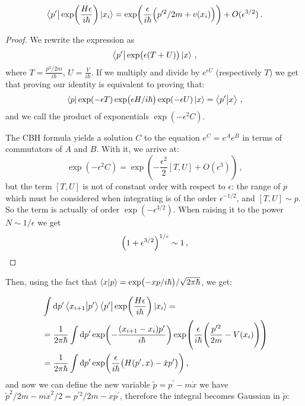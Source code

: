 \documentclass[main.tex]{subfiles}
\begin{document}
\begin{claim}
\begin{equation}
  \bra{p'} 
  \exp(\frac{H \epsilon }{i \hbar}) \ket{x_i}
  = \exp(\frac{\epsilon }{i \hbar} \qty(p^{\prime 2}/2m + v(x_{i}))) + O(\epsilon^{3/2})
\,.
\end{equation}
\end{claim}

\begin{proof}
  We rewrite the expression as 
  \begin{equation}
    \bra{p^{\prime }} \exp(\epsilon (T+U)) \ket{x}  
  \,,
  \end{equation}
  where \(T = \frac{p^2/2m}{ i \hbar} \), \(U = \frac{V}{i \hbar}\).
  If we multiply and divide by \(e^{\epsilon U}\) (respectively \(T\)) we get that proving our identity is equivalent to proving that: 
  \begin{equation}
    \bra{p} \exp(-\epsilon T) \exp(\epsilon H / i \hbar) \exp(-\epsilon U) \ket{x}  = \braket{p'}{x} 
  \,,
  \end{equation}
  and we call the product of exponentials \(\exp(-\epsilon^2 C) \).

  The CBH formula yields a solution \(C\) to the equation \(e^{C}= e^{A}e^{B}\) in terms of commutators of \(A\) and \(B\).
  With it, we arrive at:  
  \begin{equation}
    \exp(-\epsilon^2 C) = \exp(- \frac{\epsilon^2}{2} [T, U] + O(\epsilon^3)) 
  \,,
  \end{equation}
  but the term \([T, U]\) is not of constant order with respect to \(\epsilon \): the range of \(p\) which must be considered when integrating is of the order \(\epsilon^{-1/2}\), and \([T, U] \sim p\). So the term is actually of order \(\exp(-\epsilon^{3/2}) \). When raising it to the power \(N \sim 1/ \epsilon \) we get 
  \begin{equation}
    \qty(1 + \epsilon^{3/2})^{1/\epsilon } \sim 1 
  \,,
  \end{equation}
\end{proof}

Then, using the fact that \(\braket{x}{p} = \exp(-xp/i\hbar) / \sqrt{2 \pi \hbar} \), we get: 


%
\begin{subequations}
\begin{align}
  &\int  \dd{p'} \braket{x_{i+1}}{p'} \bra{p'} 
  \exp(\frac{H \epsilon }{i \hbar}) \ket{x_i} =  \\
  &= \frac{1}{2 \pi \hbar} \int  \dd{p^{\prime }} 
  \exp(-\frac{\qty(x_{i+1}-x_{i})p^{\prime }}{i \hbar}) 
  \exp(\frac{\epsilon }{i \hbar}\qty(\frac{p^{\prime 2}}{2m} - V(x_{i})))  \\
  &= \frac{1}{2 \pi \hbar}
  \int  \dd{p^{\prime }} \exp(\frac{\epsilon}{i \hbar} \qty(H(p^{\prime}, x ) - \dot{x} p^{\prime }))
  \,,
\end{align}
\end{subequations}
%
and now we can define the new variable \(\widetilde{p} = p^{\prime } - m \dot{x}\) we have \(\widetilde{p}^2/2m - m \dot{x}^2 /2 = p^{\prime 2} /2m - \dot{x} p^{\prime }\), therefore the integral becomes Gaussian in \(\widetilde{p}\): 
%
\end{document}
